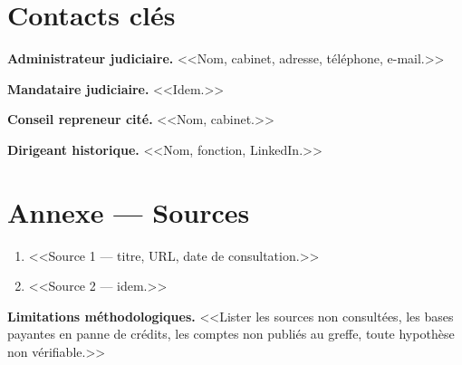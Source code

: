 \documentclass[11pt,a4paper]{article}
\begin{document}
\section{Contacts clés}

\textbf{Administrateur judiciaire.} <<Nom, cabinet, adresse, téléphone, e-mail.>>

\textbf{Mandataire judiciaire.} <<Idem.>>

\textbf{Conseil repreneur cité.} <<Nom, cabinet.>>

\textbf{Dirigeant historique.} <<Nom, fonction, LinkedIn.>>

\section*{Annexe --- Sources}

\begin{enumerate}[leftmargin=2em]
  \item <<Source 1 --- titre, URL, date de consultation.>>
  \item <<Source 2 --- idem.>>
\end{enumerate}

\textbf{Limitations méthodologiques.} <<Lister les sources non consultées,
les bases payantes en panne de crédits, les comptes non publiés au greffe,
toute hypothèse non vérifiable.>>
\end{document}
